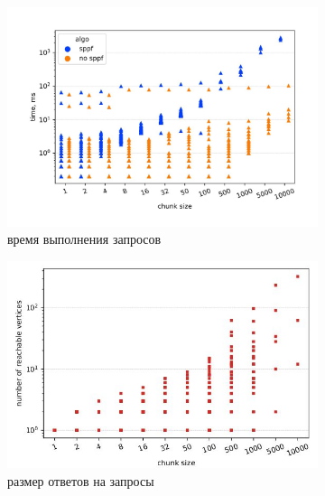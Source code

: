 \documentclass[14pt]{matmex-diploma-custom}
\theoremstyle{definition}
\begin{document}
\begin{figure}[H]
    \begin{center}
    \begin{subfigure}[b]{0.8\textwidth}
    \centering
    \includegraphics[width=\textwidth]{pics/enzyme_sppf_st.pdf_1.jpg}  \caption{время выполнения запросов}
    \label{fig:subim1}
    \end{subfigure}%
    \end{center}
    \begin{subfigure}[b]{0.5\textwidth}
    \centering
    \includegraphics[width=\columnwidth]{pics/enzyme_ans_st.pdf_1.jpg} \caption{размер ответов на запросы}
    \label{fig:subim2}
    \end{subfigure} 
        \hfil
    \begin{subfigure}[b]{0.5\textwidth}
    \centering

\end{subfigure}
\end{figure}
\end{document}
